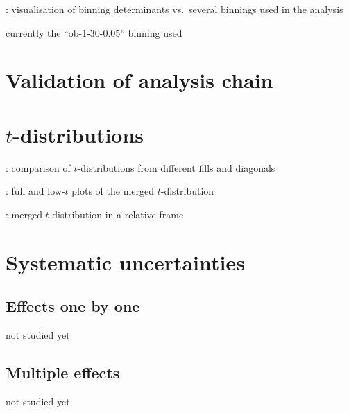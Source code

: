 \>  : visualisation of binning determinants vs.~several binnings used in
the analysis

\> currently the ``ob-1-30-0.05'' binning used



\section{Validation of analysis chain}



\section{$t$-distributions}

\> : comparison of $t$-distributions from different fills and diagonals

\> : full and low-$t$ plots of the merged $t$-distribution

\> : merged $t$-distribution in a relative frame


\section{Systematic uncertainties}

\subsection{Effects one by one}

\> not studied yet

\subsection{Multiple effects}

\> not studied yet



\bye
